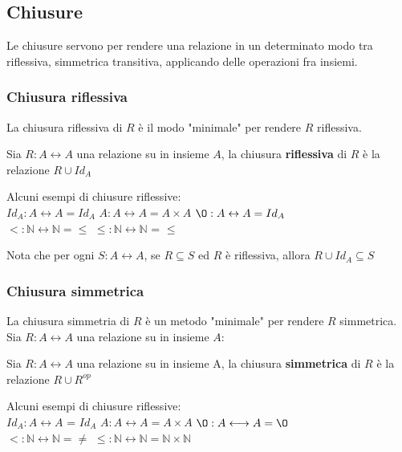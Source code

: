 \subsection{Chiusure}
Le chiusure servono per rendere una relazione in un determinato modo tra riflessiva, simmetrica transitiva, applicando delle operazioni fra insiemi.
\subsubsection{Chiusura riflessiva}
La chiusura riflessiva di $R$ è il modo "minimale" per rendere $R$ riflessiva.
\begin{definition}
    Sia $R: A \leftrightarrow A$ una relazione su in insieme $A$, la chiusura \textbf{riflessiva} di $R$ è la relazione $R \cup Id_A$
\end{definition}
\begin{example}
Alcuni esempi di chiusure riflessive:\\
$Id_A: A \leftrightarrow A = Id_A$
\hspace{.7cm}
$A: A \leftrightarrow A = A \times A$
\hspace{.7cm}
$\O: A \leftrightarrow A = Id_A$ \\
$<: \mathbb{N} \leftrightarrow \mathbb{N} = \leq$
\hspace{.7cm}
$\leq: \mathbb{N} \leftrightarrow \mathbb{N}$ = $\leq$
\end{example}
\begin{note}
Nota che per ogni $S: A \longleftrightarrow A$, se $R \subseteq S$ ed $R$ è riflessiva, allora $R \cup Id_A \subseteq S$ 
\end{note}

\subsubsection{Chiusura simmetrica}
La chiusura simmetria di $R$ è un metodo "minimale" per rendere $R$ simmetrica.
Sia $R: A \longleftrightarrow A$ una relazione su in insieme $A$:
\begin{definition}
    Sia $R: A \longleftrightarrow A$ una relazione su in insieme A, la chiusura \textbf{simmetrica} di $R$ è la relazione $R \cup R^{op}$
\end{definition}
\begin{example}
Alcuni esempi di chiusure riflessive:\\
$Id_A: A \longleftrightarrow A$ = $Id_A$
\hspace{.7cm}
$A: A \longleftrightarrow A = A \times A$
\hspace{.7cm}
$\O: A \longleftrightarrow A = \O$ \\
$<: \mathbb{N} \longleftrightarrow \mathbb{N} = \neq$
\hspace{.7cm}
$\leq: \mathbb{N} \longleftrightarrow \mathbb{N} = \mathbb{N} \times \mathbb{N}$
\end{example}

